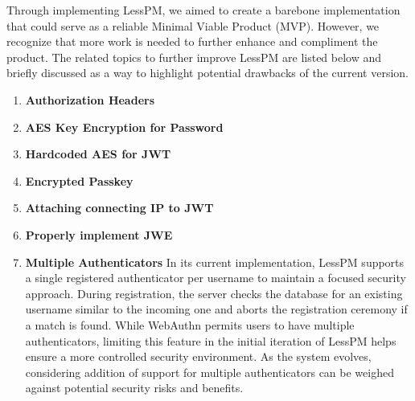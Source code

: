 Through implementing LessPM, we aimed to create a barebone implementation that
could serve as a reliable Minimal Viable Product (MVP).
However, we recognize that more work is needed to further enhance and compliment
the product.
The related topics to further improve LessPM are listed below and briefly
discussed as a way to highlight potential drawbacks of the current version.

    \begin{enumerate}[label=$\blacktriangleright$]
        \item \textbf{Authorization Headers}
        \item \textbf{AES Key Encryption for Password}
        \item \textbf{Hardcoded AES for JWT}
        \item \textbf{Encrypted Passkey}
        \item \textbf{Attaching connecting IP to JWT}
        \item \textbf{Properly implement JWE}
        \item \textbf{Multiple Authenticators}
        \newline In its current implementation, LessPM supports a single
        registered authenticator per username to maintain a focused security
        approach.
        During registration, the server checks the database for an existing
        username similar to the incoming one and aborts the registration
        ceremony if a match is found.
        While WebAuthn permits users to have multiple authenticators, limiting
        this feature in the initial iteration of LessPM helps ensure a more
        controlled security environment.
        As the system evolves, considering addition of support for multiple
        authenticators can be weighed against potential security risks and
        benefits.
    \end{enumerate}